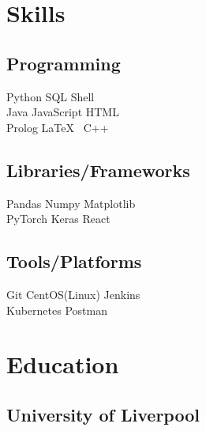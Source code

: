 \documentclass[]{CV}
\begin{document}
\begin{minipage}[t]{0.25\textwidth} 


\section{Skills}
\subsection{Programming}
\sectionsep
{}
Python \textbullet{} SQL \textbullet{} Shell \\
\sectionsep
{}
Java \textbullet{} JavaScript \textbullet{}  HTML  \\
\sectionsep
{}
Prolog \textbullet{}  \LaTeX\ \textbullet{} C++  \\
\sectionsep
\sectionsep
\subsection{Libraries/Frameworks}
\sectionsep
Pandas \textbullet{} Numpy \textbullet{} Matplotlib \\ PyTorch \textbullet{} Keras \textbullet{} React \\
\sectionsep
\sectionsep
\subsection{Tools/Platforms}
\sectionsep
Git \textbullet{} CentOS(Linux) \textbullet{} Jenkins  \\ Kubernetes \textbullet{} Postman \\

\sectionsep


\section{Education} 
\subsection{University of Liverpool}


\end{minipage}
\end{document}
